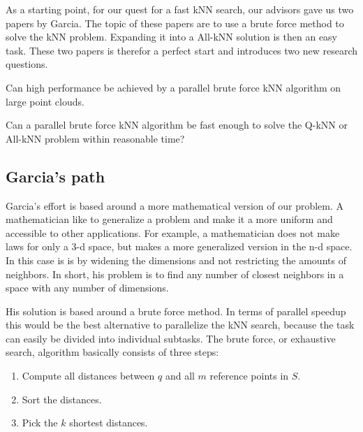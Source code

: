 As a starting point, for our quest for a fast kNN search, our advisors gave us two papers by Garcia\citep{Garcia2008, Garcia2010}. The topic of these papers are to use a brute force method to solve the kNN problem. Expanding it into a All-kNN solution is then an easy task. These two papers is therefor a perfect start and introduces two new research questions.  

\begin{myrq}
Can high performance be achieved by a parallel brute force kNN algorithm on large point clouds.
\label{rq:brute_force_performance}
\end{myrq}

\begin{myrq}
Can a parallel brute force kNN algorithm be fast enough to solve the Q-kNN or All-kNN problem within reasonable time?
\label{rq:brute_force_Q-kNN}
\end{myrq}


\subsection{Garcia's path} %
\label{sub:garcia_s_effort}
 
Garcia's effort is based around a more mathematical version of our problem. A mathematician like to generalize a problem and make it a more uniform and accessible to other applications. For example, a mathematician does not make laws for only a 3-d space, but makes a more generalized version in the n-d space. In this case is is by widening the dimensions and not restricting the amounts of neighbors. In short, his problem is to find any number of closest neighbors in a space with any number of dimensions.  

His solution is based around a brute force method. In terms of parallel speedup this would be the best alternative to parallelize the kNN search, because the task can easily be divided into individual subtasks. The brute force, or exhaustive search, algorithm basically consists of three steps:

\begin{enumerate}
       \item Compute all distances between $q$ and all $m$ reference points in $S$.
       \item Sort the distances.
       \item Pick the $k$ shortest distances.
\end{enumerate}   


